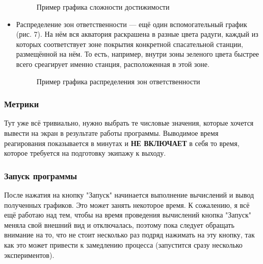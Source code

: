 \documentclass{article}
\begin{document}
\begin{itemize}
\begin{figure}[hbt!]
\begin{minipage}[h]{\linewidth}
            \end{minipage}
            \caption{Пример графика сложности достижимости}
        \end{figure}
        \item Распределение зон ответственности --- ещё один вспомогательный график (рис. 7). На нём вся акватория раскрашена в разные цвета радуги, каждый из которых соответствует зоне покрытия конкретной спасательной станции, размещённой на нём. То есть, например, внутри зоны зеленого цвета быстрее всего среагирует именно станция, расположенная в этой зоне. 
        \begin{figure}[hbt!]
            \begin{minipage}[h]{\linewidth}
            \end{minipage}
            \caption{Пример графика распределения зон ответственности}
        \end{figure}
    \end{itemize}
    \subsubsection{Метрики} 
    Тут уже всё тривиально, нужно выбрать те числовые значения, которые хочется вывести на экран в результате работы программы. Выводимое время реагирования показывается в минутах и \textbf{НЕ ВКЛЮЧАЕТ} в себя то время, которое требуется на подготовку экипажу к выходу.

    \subsubsection{Запуск программы}
    После нажатия на кнопку "Запуск" начинается выполнение вычислений и вывод полученных графиков. Это может занять некоторое время. К сожалению, я всё ещё работаю над тем, чтобы на время проведения вычислений кнопка "Запуск" меняла свой внешний вид и отключалась, поэтому пока следует обращать внимание на то, что не стоит несколько раз подряд нажимать на эту кнопку, так как это может привести к замедлению процесса (запустится сразу несколько экспериментов). 
\end{document}
